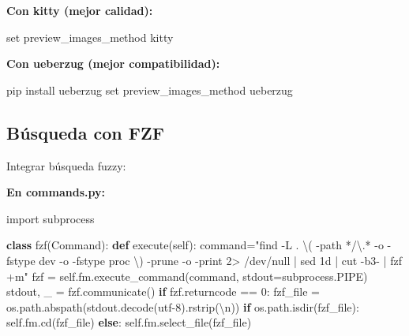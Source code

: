 \documentclass[
  doc,
  floatsintext,
  longtable,
  a4paper,
  nolmodern,
  notxfonts,
  notimes,
  12pt,
  colorlinks=true,linkcolor=blue,citecolor=blue,urlcolor=blue]{apa7}
\newenvironment{Shaded}{\begin{snugshade}}{\end{snugshade}}
\newcommand{\BuiltInTok}[1]{\textcolor[rgb]{0.00,0.23,0.31}{#1}}
\newcommand{\CharTok}[1]{\textcolor[rgb]{0.13,0.47,0.30}{#1}}
\newcommand{\ControlFlowTok}[1]{\textcolor[rgb]{0.00,0.23,0.31}{\textbf{#1}}}
\newcommand{\DecValTok}[1]{\textcolor[rgb]{0.68,0.00,0.00}{#1}}
\newcommand{\ErrorTok}[1]{\textcolor[rgb]{0.68,0.00,0.00}{#1}}
\newcommand{\ExtensionTok}[1]{\textcolor[rgb]{0.00,0.23,0.31}{#1}}
\newcommand{\ImportTok}[1]{\textcolor[rgb]{0.00,0.46,0.62}{#1}}
\newcommand{\KeywordTok}[1]{\textcolor[rgb]{0.00,0.23,0.31}{\textbf{#1}}}
\newcommand{\NormalTok}[1]{\textcolor[rgb]{0.00,0.23,0.31}{#1}}
\newcommand{\OperatorTok}[1]{\textcolor[rgb]{0.37,0.37,0.37}{#1}}
\newcommand{\StringTok}[1]{\textcolor[rgb]{0.13,0.47,0.30}{#1}}
\newcommand{\VariableTok}[1]{\textcolor[rgb]{0.07,0.07,0.07}{#1}}
\begin{document}
\textbf{Con kitty (mejor calidad):}

\begin{Shaded}
\begin{Highlighting}[]
\BuiltInTok{set}\NormalTok{ preview\_images\_method kitty}
\end{Highlighting}
\end{Shaded}

\textbf{Con ueberzug (mejor compatibilidad):}

\begin{Shaded}
\begin{Highlighting}[]
\ExtensionTok{pip}\NormalTok{ install ueberzug}
\BuiltInTok{set}\NormalTok{ preview\_images\_method ueberzug}
\end{Highlighting}
\end{Shaded}

\subsection{Búsqueda con FZF}\label{buxfasqueda-con-fzf}

Integrar búsqueda fuzzy:

\textbf{En commands.py:}

\begin{Shaded}
\begin{Highlighting}[]
\ImportTok{import}\NormalTok{ subprocess}

\KeywordTok{class}\NormalTok{ fzf(Command):}
    \KeywordTok{def}\NormalTok{ execute(}\VariableTok{self}\NormalTok{):}
\NormalTok{        command}\OperatorTok{=}\StringTok{"find {-}L . }\ErrorTok{\textbackslash{}}\StringTok{( {-}path \textquotesingle{}*/}\ErrorTok{\textbackslash{}}\StringTok{.*\textquotesingle{} {-}o {-}fstype \textquotesingle{}dev\textquotesingle{} {-}o {-}fstype \textquotesingle{}proc\textquotesingle{} }\ErrorTok{\textbackslash{}}\StringTok{) {-}prune {-}o {-}print 2\textgreater{} /dev/null | sed 1d | cut {-}b3{-} | fzf +m"}
\NormalTok{        fzf }\OperatorTok{=} \VariableTok{self}\NormalTok{.fm.execute\_command(command, stdout}\OperatorTok{=}\NormalTok{subprocess.PIPE)}
\NormalTok{        stdout, \_ }\OperatorTok{=}\NormalTok{ fzf.communicate()}
        \ControlFlowTok{if}\NormalTok{ fzf.returncode }\OperatorTok{==} \DecValTok{0}\NormalTok{:}
\NormalTok{            fzf\_file }\OperatorTok{=}\NormalTok{ os.path.abspath(stdout.decode(}\StringTok{\textquotesingle{}utf{-}8\textquotesingle{}}\NormalTok{).rstrip(}\StringTok{\textquotesingle{}}\CharTok{\textbackslash{}n}\StringTok{\textquotesingle{}}\NormalTok{))}
            \ControlFlowTok{if}\NormalTok{ os.path.isdir(fzf\_file):}
                \VariableTok{self}\NormalTok{.fm.cd(fzf\_file)}
            \ControlFlowTok{else}\NormalTok{:}
                \VariableTok{self}\NormalTok{.fm.select\_file(fzf\_file)}
\end{Highlighting}
\end{Shaded}
\end{document}
